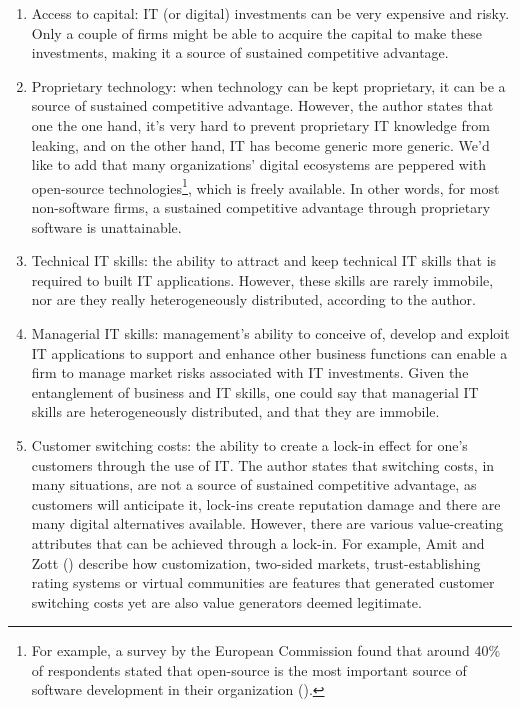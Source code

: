 \documentclass[
  man,floatsintext]{apa6}
\providecommand{\tightlist}{%
  \setlength{\itemsep}{0pt}\setlength{\parskip}{0pt}}
\begin{document}
\begin{enumerate}
\def\labelenumi{\arabic{enumi}.}
\tightlist
\item
  Access to capital: IT (or digital) investments can be very expensive and risky. Only a couple of firms might be able to acquire the capital to make these investments, making it a source of sustained competitive advantage.
\item
  Proprietary technology: when technology can be kept proprietary, it can be a source of sustained competitive advantage. However, the author states that one the one hand, it's very hard to prevent proprietary IT knowledge from leaking, and on the other hand, IT has become generic more generic. We'd like to add that many organizations' digital ecosystems are peppered with open-source technologies\footnote{For example, a survey by the European Commission found that around 40\% of respondents stated that open-source is the most important source of software development in their organization ().}, which is freely available. In other words, for most non-software firms, a sustained competitive advantage through proprietary software is unattainable.
\item
  Technical IT skills: the ability to attract and keep technical IT skills that is required to built IT applications. However, these skills are rarely immobile, nor are they really heterogeneously distributed, according to the author.
\item
  Managerial IT skills: management's ability to conceive of, develop and exploit IT applications to support and enhance other business functions can enable a firm to manage market risks associated with IT investments. Given the entanglement of business and IT skills, one could say that managerial IT skills are heterogeneously distributed, and that they are immobile.
\item
  Customer switching costs: the ability to create a lock-in effect for one's customers through the use of IT. The author states that switching costs, in many situations, are not a source of sustained competitive advantage, as customers will anticipate it, lock-ins create reputation damage and there are many digital alternatives available. However, there are various value-creating attributes that can be achieved through a lock-in. For example, Amit and Zott () describe how customization, two-sided markets, trust-establishing rating systems or virtual communities are features that generated customer switching costs yet are also value generators deemed legitimate.
\end{enumerate}
\end{document}
